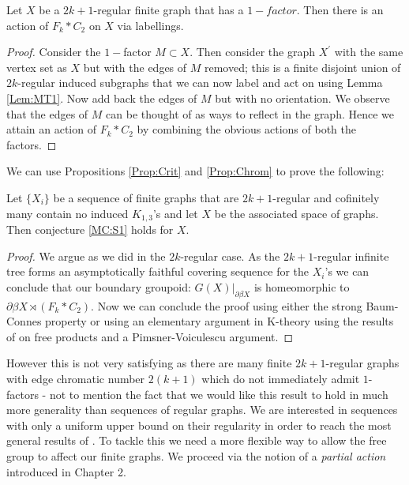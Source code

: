 \begin{proposition}\label{Prop:Chrom}
Let $X$ be a $2k+1$-regular finite graph that has a $1-factor$. Then there is an action of $F_{k}\ast C_{2}$ on $X$ via labellings.
\end{proposition}
\begin{proof}
Consider the $1-$factor $M\subset X$. Then consider the graph $X^{'}$ with the same vertex set as $X$ but with the edges of $M$ removed; this is a finite disjoint union of $2k$-regular induced subgraphs that we can now label and act on using Lemma \ref{Lem:MT1}. Now add back the edges of $M$ but with no orientation. We observe that the edges of $M$ can be thought of as ways to reflect in the graph. Hence we attain an action of $F_{k}\ast C_{2}$ by combining the obvious actions of both the factors. 
\end{proof}

We can use Propositions \ref{Prop:Crit} and \ref{Prop:Chrom} to prove the following:

\begin{theorem}\label{Thm:MR2}
Let $\lbrace X_{i} \rbrace$ be a sequence of finite graphs that are $2k+1$-regular and cofinitely many contain no induced $K_{1,3}$'s and let $X$ be the associated space of graphs. Then conjecture \ref{MC:S1} holds for $X$.
\end{theorem}
\begin{proof}
We argue as we did in the $2k$-regular case. As the $2k+1$-regular infinite tree forms an asymptotically faithful covering sequence for the $X_{i}$'s we can conclude that our boundary groupoid: $G(X)|_{\partial \beta X}$ is homeomorphic to $\partial\beta X\rtimes (F_{k}\ast C_{2})$. Now we can conclude the proof using either the strong Baum-Connes property or using an elementary argument in K-theory using the results of \cite{MR723010} on free products and a Pimsner-Voiculescu argument.
\end{proof}

However this is not very satisfying as there are many finite $2k+1$-regular graphs with edge chromatic number $2(k+1)$ which do not immediately admit $1$-factors - not to mention the fact that we would like this result to hold in much more generality than sequences of regular graphs. We are interested in sequences with only a uniform upper bound on their regularity in order to reach the most general results of \cite{explg1}. To tackle this we need a more flexible way to allow the free group to affect our finite graphs. We proceed via the notion of a \textit{partial action} introduced in Chapter 2.

